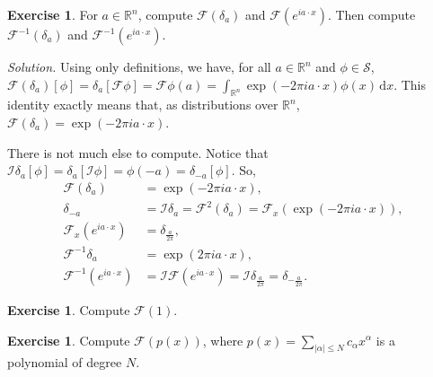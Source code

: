 \documentclass[a4paper,9pt]{amsart}
\newcommand{\scr}[1]{\mathscr{#1}}
\newcommand{\cal}[1]{\mathcal{#1}}
\newcommand{\R}{\mathbb{R}}	%
\newcommand{\did}{\,\mathrm{d}}	%
\newcommand{\TODO}{{\bf\color{Red}TODO}}
\theoremstyle{plain}
\theoremstyle{definition}
\newtheorem{exercise}[proposition]{Exercise}%
\theoremstyle{remark}
\begin{document}
\begin{exercise}\label{ex6834885c}
	For $a\in\R^n$, compute $\scr F(\delta_a)$ and $\scr F(e^{ia\cdot x})$.
	Then compute $\scr F^{-1}(\delta_a)$ and $\scr F^{-1}(e^{ia\cdot x})$.
	
	{\it Solution.}
	Using only definitions, we have,
	for all $a\in\R^n$ and $\phi\in\scr S$,
	$\scr F(\delta_a)[\phi]
	= \delta_a[\scr F\phi]
	= \scr F\phi(a)
	= \int_{\R^n} \exp(-2\pi ia\cdot x) \phi(x) \did x$.
	This identity exactly means that, as distributions over $\R^n$,
	$\scr F(\delta_a) = \exp(-2\pi ia\cdot x)$.
	
	There is not much else to compute.
	Notice that $\cal I\delta_a[\phi] = \delta_a[\cal I\phi] = \phi(-a) =\delta_{-a}[\phi]$.
	So,
	\begin{align}
		\scr F(\delta_a) &= \exp(-2\pi ia\cdot x) , \\
		\delta_{-a} &= \cal I \delta_a = \scr F^2(\delta_a) = \scr F_x(\exp(-2\pi ia\cdot x)) ,\\ 
		\scr F_x(e^{ia\cdot x}) &= \delta_{\frac{a}{2\pi}} , \\
		\scr F^{-1}\delta_a &= \exp(2\pi ia\cdot x) , \label{eq683488c2}\\
		\scr F^{-1}(e^{ia\cdot x}) &= \cal I\scr F(e^{ia\cdot x}) = \cal I\delta_{\frac{a}{2\pi}} = \delta_{-\frac{a}{2\pi}} .
	\end{align}
\end{exercise}

\begin{exercise}
	Compute $\scr F(1)$.
\end{exercise}

%
%

\begin{exercise}
	Compute $\scr F(p(x))$, where $p(x) = \sum_{|\alpha|\le N} c_\alpha x^\alpha$ is a polynomial of degree $N$.
\end{exercise}
\end{document}
